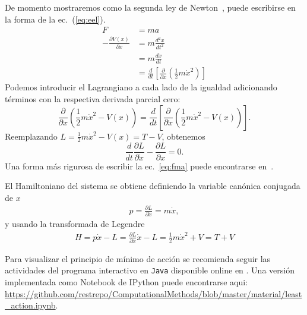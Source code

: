 De momento mostraremos como la segunda ley de Newton~\cite{NewtonSeconLaw}, puede escribirse en la forma de la ec.~(\ref{eq:eel}).
\begin{align}
\label{eq:fma}
  F&=ma\\
  -\frac{\partial V(x)}{\partial x}&=m\frac{d^2x}{dt^2}\nonumber\\
  &=m\frac{d\dot{x}}{dt}\nonumber\\
  &=\frac{d}{dt}
  \left[
    \frac{\partial}{\partial\dot{x}}
    \left(
      \frac{1}{2}m\dot{x}^2
    \right)
  \right]\nonumber
\end{align}
Podemos introducir el Lagrangiano a cada lado de la igualdad adicionando términos con la respectiva derivada parcial cero:
\begin{equation*}
  \frac{\partial}{\partial x}
  \left(
\frac{1}{2}m\dot{x}^2-V(x)
  \right)=\frac{d}{dt}
  \left[
    \frac{\partial}{\partial\dot{x}}
    \left(
      \frac{1}{2}m\dot{x}^2-V(x)
    \right)
  \right].
\end{equation*}
Reemplazando $L=\frac{1}{2}m\dot{x}^2-V(x)=T-V$, obtenemos
\begin{equation*}
\frac{d}{dt}\frac{\partial L}{\partial\dot{x}}  -\frac{\partial L}{\partial x}=0.
\end{equation*}
Una forma más rigurosa de escribir la ec.~\eqref{eq:fma} puede encontrarse en~\cite{ActionPhysics}. 

El Hamiltoniano del sistema se obtiene definiendo la variable canónica conjugada de $x$
\begin{align}
  p=\frac{\partial L}{\partial\dot{x}}=m \dot{x},
\end{align}
y usando la transformada de Legendre
\begin{align}
  H=p \dot{x}-L=\frac{\partial{L}}{\partial\dot{x}}\dot{x}-L=\frac{1}{2}m\dot{x}^2+V=T+V
\end{align}

Para visualizar el principio de mínimo de acción se recomienda seguir las actividades del programa interactivo en \texttt{Java} disponible online en \cite{JavaAP}. 
Una versión implementada como Notebook de IPython puede encontrarse aqui: \url{https://github.com/restrepo/ComputationalMethods/blob/master/material/least_action.ipynb}.

